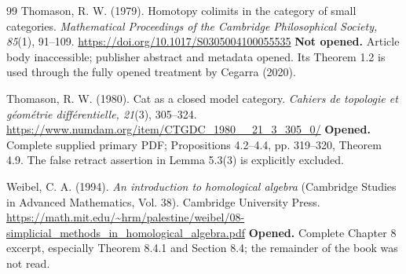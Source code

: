 \documentclass[11pt,a4paper]{article}
\theoremstyle{definition}
\theoremstyle{remark}
\begin{document}
\begin{thebibliography}{99}
Thomason, R. W. (1979). Homotopy colimits in the category of small categories. \emph{Mathematical Proceedings of the Cambridge Philosophical Society, 85}(1), 91--109. \url{https://doi.org/10.1017/S0305004100055535}
\newline\textbf{Not opened.} Article body inaccessible; publisher abstract and metadata opened. Its Theorem 1.2 is used through the fully opened treatment by Cegarra (2020).

Thomason, R. W. (1980). Cat as a closed model category. \emph{Cahiers de topologie et g\'eom\'etrie diff\'erentielle, 21}(3), 305--324. \url{https://www.numdam.org/item/CTGDC_1980__21_3_305_0/}
\newline\textbf{Opened.} Complete supplied primary PDF; Propositions 4.2--4.4, pp. 319--320, Theorem 4.9. The false retract assertion in Lemma 5.3(3) is explicitly excluded.

Weibel, C. A. (1994). \emph{An introduction to homological algebra} (Cambridge Studies in Advanced Mathematics, Vol. 38). Cambridge University Press. \url{https://math.mit.edu/~hrm/palestine/weibel/08-simplicial_methods_in_homological_algebra.pdf}
\newline\textbf{Opened.} Complete Chapter 8 excerpt, especially Theorem 8.4.1 and Section 8.4; the remainder of the book was not read.
\end{thebibliography}

\end{document}
